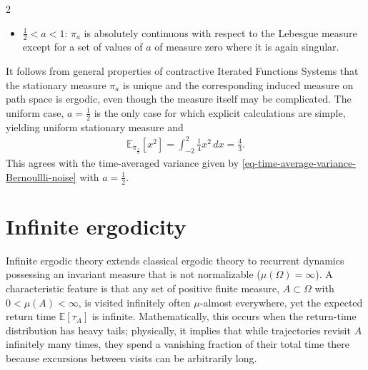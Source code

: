 \documentclass[11pt]{article}
\begin{document}
\begin{multicols}{2}
\begin{itemize}
\item $\frac{1}{2} < a < 1$: $\pi_a$ is absolutely continuous with respect to the Lebesgue measure except for a set of values of $a$ of measure zero where it is again singular.
\end{itemize}
It follows from general properties of contractive Iterated Functions Systems that the stationary measure $\pi_a$ is unique and the corresponding induced measure on path space is ergodic, even though the measure itself may be complicated.
The uniform case, $a=\frac{1}{2}$ is the only case for which explicit calculations are simple, yielding uniform stationary measure and
\begin{align}
 \mathbb{E}_{\pi_\frac{1}{2}}\left[ x^2\right] = \int_{-2}^2 \frac{1}{4} x^2 \, dx = \frac{4}{3}.
\end{align}
This agrees with the time-averaged variance given by \eqref{eq-time-average-variance-Bernoullli-noise} with $a=\frac{1}{2}$.

\section{Infinite ergodicity}
\label{sec-infinite-ergodicity}
Infinite ergodic theory extends classical ergodic theory to recurrent dynamics possessing an invariant measure that is not normalizable ($\mu(\Omega)=\infty$). A characteristic feature is that any set of positive finite measure, $A \subset \Omega$ with $0 < \mu(A) < \infty$, is visited infinitely often $\mu$-almost everywhere, yet the expected return time $\mathbb{E}[\tau_A]$ is infinite. Mathematically, this occurs when the return-time distribution has heavy tails; physically, it implies that while trajectories revisit $A$ infinitely many times, they spend a vanishing fraction of their total time there because excursions between visits can be arbitrarily long. 



\end{multicols}
\end{document}
